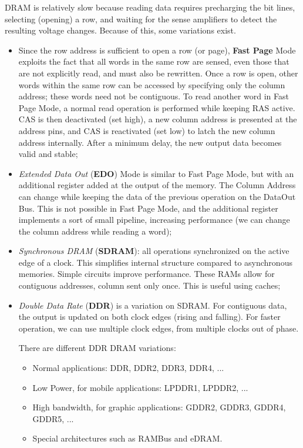 \documentclass[a4paper,11pt]{article}
\begin{document}
DRAM is relatively slow because reading data requires precharging the bit lines, selecting (opening) a row, and waiting for the sense amplifiers to detect the resulting voltage changes.
Because of this, some variations exist.
\begin{itemize}
	\item Since the row address is sufficient to open a row (or page), \textbf{Fast Page} Mode exploits the fact that all words in the same row are sensed, even those that are not explicitly read, and must also be rewritten. Once a row is open, other words within the same row can be accessed by specifying only the column address; these words need not be contiguous. To read another word in Fast Page Mode, a normal read operation is performed while keeping RAS active. CAS is then deactivated (set high), a new column address is presented at the address pins, and CAS is reactivated (set low) to latch the new column address internally. After a minimum delay, the new output data becomes valid and stable;

	\item \textit{Extended Data Out} (\textbf{EDO}) Mode is similar to Fast Page Mode, but with an additional register added at the output of the memory. The Column Address can change while keeping the data of the previous operation on the DataOut Bus.
	      This is not possible in Fast Page Mode, and the additional register implements a sort of small pipeline, increasing performance (we can change the column address while reading a word);

	\item \textit{Synchronous DRAM} (\textbf{SDRAM}): all operations synchronized on the active edge of a clock. This simplifies internal structure compared to asynchronous memories.
	      Simple circuits improve performance.
	      These RAMs allow for contiguous addresses, column sent only once. This is useful using caches;

	\item \textit{Double Data Rate} (\textbf{DDR}) is a variation on SDRAM. For contiguous data, the output is updated on both clock edges (rising and falling). For faster operation, we can use multiple clock edges, from multiple clocks out of phase.

	      There are different DDR DRAM variations:
	      \begin{itemize}
		      \item Normal applications: DDR, DDR2, DDR3, DDR4, ...
		      \item Low Power, for mobile applications: LPDDR1, LPDDR2, ...
		      \item High bandwidth, for graphic applications: GDDR2, GDDR3, GDDR4, GDDR5, ...
		      \item Special architectures such as RAMBus and eDRAM.
	      \end{itemize}

\end{itemize}
\end{document}
